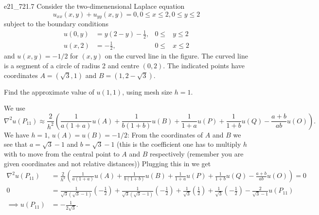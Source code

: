 
\begin{problemwithimage}{e21_7}{21.7}
  Consider the two-dimenensional Laplace equation
  \begin{equation*}
    u_{x x}(x,y) + u_{yy}(x,y) = 0, 0\leq x\leq 2, 0 \leq y\leq 2
  \end{equation*}
  subject to the boundary conditions
  \begin{align*}
    u(0,y) &= y(2-y) - \frac{1}{2}, & 0 \leq &y \leq 2 \\
    u(x,2) &= - \frac{1}{2}, & 0 \leq &x \leq 2
  \end{align*}
  and $u(x,y) = - 1 / 2$ for $(x,y)$ on the curved line in the figure.
  The curved line is a segment of a circle of radius 2 and centre $(0,2)$.
  The indicated points have coordinates $A = (\sqrt{3}, 1)$ and $B = (1, 2 - \sqrt{3})$.
  
  Find the approximate value of $u(1,1)$, using mesh size $h = 1$.
\end{problemwithimage}

\begin{derivation}
  We use
  \begin{equation*}
    \nabla^2 u(P_{11}) \approx \frac{2}{h^2} \left( \frac{1}{a (1 + a)} u(A) + \frac{1}{b(1+b)}u(B) + \frac{1}{1+a}u(P) + \frac{1}{1+b}u(Q) - \frac{a+ b}{ab} u(O) \right)
  .\end{equation*}
  We have $h = 1$, $u(A) = u(B) = - 1 / 2$:
  From the coordinates of $A$ and $B$ we see that $a = \sqrt{3}- 1$ and $b = \sqrt{3} - 1$ (this is the coefficient one has to multiply $h$ with to move from the central point to $A$ and $B$ respectively (remember you are given coordinates and not relative distances))
  Plugging this in we get
  \begin{align*}
    \nabla^2 u(P_{11}) &= \frac{2}{h^2} \left( \frac{1}{a (1 + a)} u(A) + \frac{1}{b(1+b)}u(B) + \frac{1}{1+a}u(P) + \frac{1}{1+b}u(Q) - \frac{a+ b}{ab} u(O) \right) = 0\\
    0&= \frac{1}{\sqrt{3} (\sqrt{3}-1)} \left( -\frac{1}{2} \right) + \frac{1}{\sqrt{3}(\sqrt{3}-1)} \left( -\frac{1}{2} \right) + \frac{1}{\sqrt{3}} \left( \frac{1}{2} \right) + \frac{1}{\sqrt{3}} \left( - \frac{1}{2} \right) - \frac{2}{\sqrt{3}-1} u(P_{11}) \\
    \implies u(P_{11}) &= - \frac{1}{2 \sqrt{3}}
  .\end{align*}
\end{derivation}


